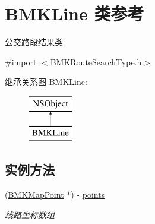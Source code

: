 \hypertarget{interface_b_m_k_line}{\section{B\-M\-K\-Line 类参考}
\label{interface_b_m_k_line}
}


公交路段结果类  




{\ttfamily \#import $<$B\-M\-K\-Route\-Search\-Type.\-h$>$}

继承关系图 B\-M\-K\-Line\-:\begin{figure}[H]
\begin{center}
\leavevmode
\includegraphics[height=2.000000cm]{interface_b_m_k_line}
\end{center}
\end{figure}
\subsection*{实例方法}
\begin{DoxyCompactItemize}
\item 
\hypertarget{interface_b_m_k_line_a33ce45bbba8d52b02ab9a8d01bcc29cf}{(\hyperlink{struct_b_m_k_map_point}{B\-M\-K\-Map\-Point} $\ast$) -\/ \hyperlink{interface_b_m_k_line_a33ce45bbba8d52b02ab9a8d01bcc29cf}{points}}\label{interface_b_m_k_line_a33ce45bbba8d52b02ab9a8d01bcc29cf}

\begin{DoxyCompactList}\small\item\em 线路坐标数组 \end{DoxyCompactList}\end{DoxyCompactItemize}
